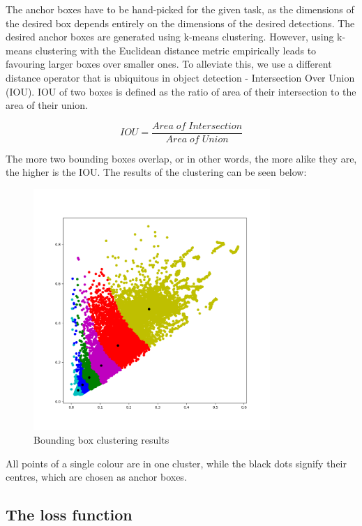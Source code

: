 \documentclass[12pt,letterpaper]{article}
\begin{document}
The anchor boxes have to be hand-picked for the given task, as the dimensions of the desired box depends entirely on the dimensions of the desired detections. The desired anchor boxes are generated using k-means clustering. However, using k-means clustering with the Euclidean distance metric empirically leads to favouring larger boxes over smaller ones. To alleviate this, we use a different distance operator that is ubiquitous in object detection - Intersection Over Union (IOU). IOU of two boxes is defined as the ratio of area of their intersection to the area of their union.

\[ IOU = \frac{Area\;of\;Intersection}{Area\;of\;Union} \]

The more two bounding boxes overlap, or in other words, the more alike they are, the higher is the IOU. The results of the clustering can be seen below:

    \begin{figure}[h!]
        \centering
        \includegraphics[width=0.8\textwidth,keepaspectratio]{assets/plot.png}
        \caption{Bounding box clustering results}
    \end{figure}

All points of a single colour are in one cluster, while the black dots signify their centres, which are chosen as anchor boxes.

\subsection{The loss function}
\end{document}

